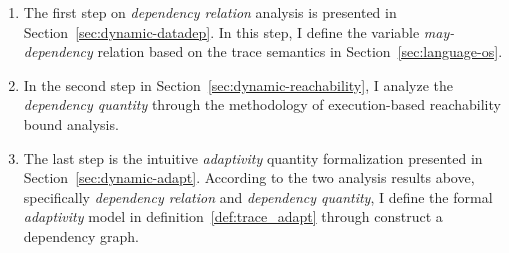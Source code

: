  \begin{enumerate}
 \item The first step on \emph{dependency relation} analysis is presented in 
 Section~\ref{sec:dynamic-datadep}.
 In this step, I define the variable \emph{may-dependency} relation based on the trace semantics in Section~\ref{sec:language-os}.
 \item In the second step in Section~\ref{sec:dynamic-reachability}, I analyze the \emph{dependency quantity} through the methodology of execution-based reachability bound analysis.
 \item The last step is the intuitive \emph{adaptivity} quantity formalization presented in Section~\ref{sec:dynamic-adapt}.
 According to the two analysis results above, specifically \emph{dependency relation} and \emph{dependency quantity},
 I define the formal \emph{adaptivity} model in definition~\ref{def:trace_adapt} through 
 construct a dependency graph.
 \end{enumerate}
